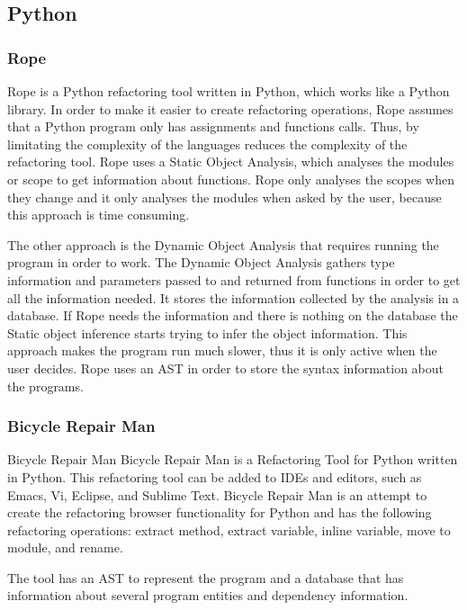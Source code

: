 \subsection{Python}

\subsubsection{Rope}
Rope\cite[p.~109]{govindaraj2015test} is a Python refactoring tool written in Python, which works like a Python library.
In order to make it easier to create refactoring operations, Rope assumes that a
Python program only has assignments and functions calls. %
Thus, by limitating the complexity of the languages reduces the complexity of the
refactoring tool.
Rope uses a Static Object Analysis, which analyses the modules or scope to get
information about functions.
Rope only analyses the scopes when they change and it only analyses the modules
when asked by the user, because this approach is time consuming.

The other approach is the Dynamic Object Analysis that requires running
the program in order to work.
The Dynamic Object Analysis gathers type information and parameters passed to and returned from
functions in order to get all the information needed.
It stores the information collected by the analysis in a database.
If Rope needs the information and there is nothing on the database the Static
object inference starts trying to infer the object information.
This approach makes the program run much slower, thus it is only active when
the user decides.%
Rope uses an AST in order to store the syntax information about the programs.

\subsubsection{Bicycle Repair Man}
Bicycle Repair Man
Bicycle Repair Man is a Refactoring Tool for Python written in Python.
 This refactoring tool can be added to IDEs and editors, such as Emacs, Vi, Eclipse,
  and Sublime Text.
Bicycle Repair Man is an attempt to create the refactoring browser functionality for
 Python and has the following refactoring operations:
 extract method, extract variable, inline variable, move to module, and rename.

The tool has an AST to represent the program and a database that has information
about several program entities and dependency information.

